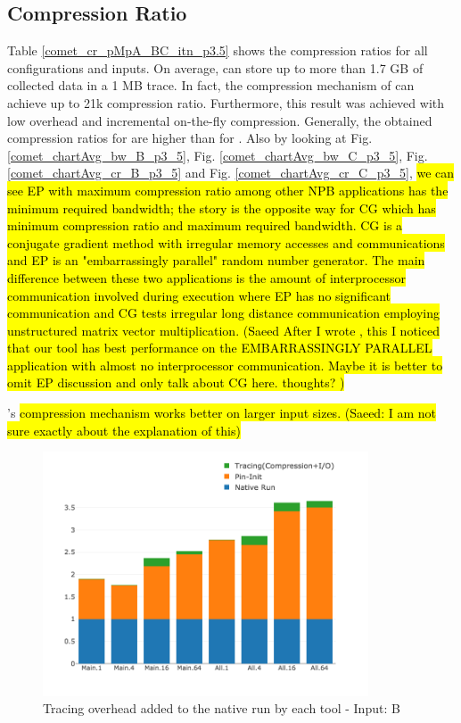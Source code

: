   
\subsection{Compression Ratio}
\label{subsec:cr}

Table \ref{comet_cr_pMpA_BC_itn_p3.5} shows the compression ratios for all configurations and inputs. 
On average, \parlot can store up to more than 1.7 GB of collected data in a 1 MB trace. 
In fact, the compression mechanism of
\parlot can achieve up to 21k compression ratio.
%
Furthermore, this result was achieved with low overhead and incremental  
on-the-fly compression.
%
Generally, the obtained
compression ratios for \parlotm are higher than for \parlota. Also by looking at Fig. \ref{comet_chartAvg_bw_B_p3_5}, Fig. \ref{comet_chartAvg_bw_C_p3_5}, Fig. \ref{comet_chartAvg_cr_B_p3_5} and Fig. \ref{comet_chartAvg_cr_C_p3_5},\hl{ we can see EP with maximum compression ratio among other NPB applications has the minimum required bandwidth; the story is the opposite way for CG which has minimum compression ratio and maximum required bandwidth. CG is a conjugate gradient method with irregular memory accesses and communications and EP is an "embarrassingly parallel" random number generator. The main difference between these two applications is the amount of interprocessor communication involved during execution where EP has no significant communication and CG tests irregular long distance communication employing  unstructured matrix vector multiplication. (Saeed After I wrote , this I noticed that our tool has best performance on the EMBARRASSINGLY PARALLEL application with almost no interprocessor communication. Maybe it is better to omit EP discussion and only talk about CG here. thoughts? ) }
%

\parlot's \hl{compression mechanism works better on larger input sizes. (Saeed: I am not sure exactly about the explanation of this)}
  


\begin{figure}[t]
\centering
\includegraphics[width=3.8in]{figs.comet.newMed/comet_chartDet_B_wc_byTool_p3_5.png}
\caption{ Tracing overhead added to the native run by each tool - Input: B}
\label{comet_chartDet_B_wc_byTool_p3_5}
\end{figure}


